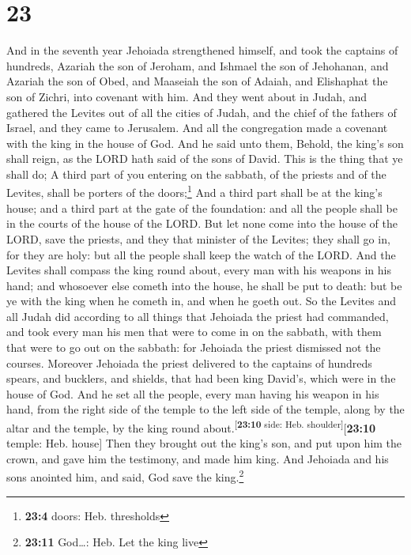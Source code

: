 \hypertarget{section-22}{%
\section{23}\label{section-22}}

 And in the seventh year Jehoiada strengthened himself,
and took the captains of hundreds, Azariah the son of Jeroham, and
Ishmael the son of Jehohanan, and Azariah the son of Obed, and Maaseiah
the son of Adaiah, and Elishaphat the son of Zichri, into covenant with
him.  And they went about in Judah, and gathered the
Levites out of all the cities of Judah, and the chief of the fathers of
Israel, and they came to Jerusalem.  And all the
congregation made a covenant with the king in the house of God. And he
said unto them, Behold, the king's son shall reign, as the LORD hath
said of the sons of David.  This is the thing that ye
shall do; A third part of you entering on the sabbath, of the priests
and of the Levites, shall be porters of the doors;\footnote{\textbf{23:4}
  doors: Heb. thresholds}  And a third part shall be at
the king's house; and a third part at the gate of the foundation: and
all the people shall be in the courts of the house of the LORD.
 But let none come into the house of the LORD, save the
priests, and they that minister of the Levites; they shall go in, for
they are holy: but all the people shall keep the watch of the LORD.
 And the Levites shall compass the king round about, every
man with his weapons in his hand; and whosoever else cometh into the
house, he shall be put to death: but be ye with the king when he cometh
in, and when he goeth out.  So the Levites and all Judah
did according to all things that Jehoiada the priest had commanded, and
took every man his men that were to come in on the sabbath, with them
that were to go out on the sabbath: for Jehoiada the priest dismissed
not the courses.  Moreover Jehoiada the priest delivered
to the captains of hundreds spears, and bucklers, and shields, that had
been king David's, which were in the house of God.  And
he set all the people, every man having his weapon in his hand, from the
right side of the temple to the left side of the temple, along by the
altar and the temple, by the king round
about.\textsuperscript{{[}\textbf{23:10} side: Heb.
shoulder{]}}{[}\textbf{23:10} temple: Heb. house{]}  Then
they brought out the king's son, and put upon him the crown, and gave
him the testimony, and made him king. And Jehoiada and his sons anointed
him, and said, God save the king.\footnote{\textbf{23:11} God\ldots:
  Heb. Let the king live}

